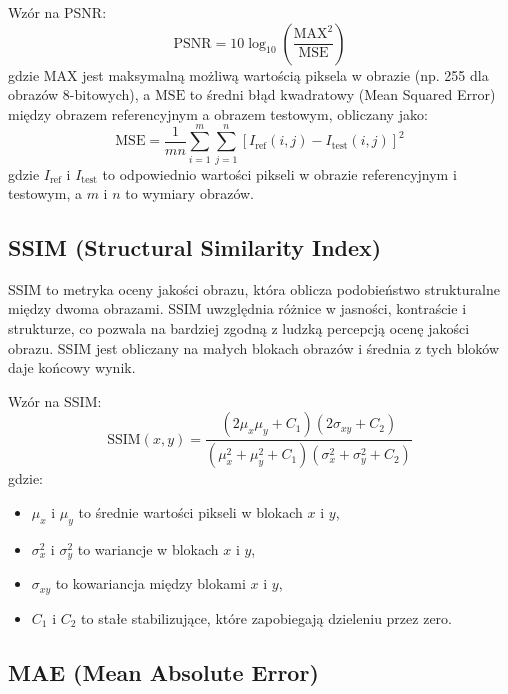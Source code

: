 \documentclass[10pt]{article}
\begin{document}
Wzór na PSNR:
\begin{equation}
    \text{PSNR} = 10 \log_{10} \left( \frac{\text{MAX}^2}{\text{MSE}} \right)
\end{equation}
gdzie \(\text{MAX}\) jest maksymalną możliwą wartością piksela w obrazie (np. 255 dla obrazów 8-bitowych), a \(\text{MSE}\) to średni błąd kwadratowy (Mean Squared Error) między obrazem referencyjnym a obrazem testowym, obliczany jako:
\begin{equation}
    \text{MSE} = \frac{1}{mn} \sum_{i=1}^{m} \sum_{j=1}^{n} \left[ I_{\text{ref}}(i,j) - I_{\text{test}}(i,j) \right]^2
\end{equation}
gdzie \(I_{\text{ref}}\) i \(I_{\text{test}}\) to odpowiednio wartości pikseli w obrazie referencyjnym i testowym, a \(m\) i \(n\) to wymiary obrazów.

\subsection*{SSIM (Structural Similarity Index)}

SSIM to metryka oceny jakości obrazu, która oblicza podobieństwo strukturalne między dwoma obrazami. SSIM uwzględnia różnice w jasności, kontraście i strukturze, co pozwala na bardziej zgodną z ludzką percepcją ocenę jakości obrazu. SSIM jest obliczany na małych blokach obrazów i średnia z tych bloków daje końcowy wynik.

Wzór na SSIM:
\begin{equation}
    \text{SSIM}(x, y) = \frac{(2\mu_x \mu_y + C_1)(2\sigma_{xy} + C_2)}{(\mu_x^2 + \mu_y^2 + C_1)(\sigma_x^2 + \sigma_y^2 + C_2)}
\end{equation}
gdzie:
\begin{itemize}
    \item \(\mu_x\) i \(\mu_y\) to średnie wartości pikseli w blokach \(x\) i \(y\),
    \item \(\sigma_x^2\) i \(\sigma_y^2\) to wariancje w blokach \(x\) i \(y\),
    \item \(\sigma_{xy}\) to kowariancja między blokami \(x\) i \(y\),
    \item \(C_1\) i \(C_2\) to stałe stabilizujące, które zapobiegają dzieleniu przez zero.
\end{itemize}

\subsection*{MAE (Mean Absolute Error)}
\end{document}
